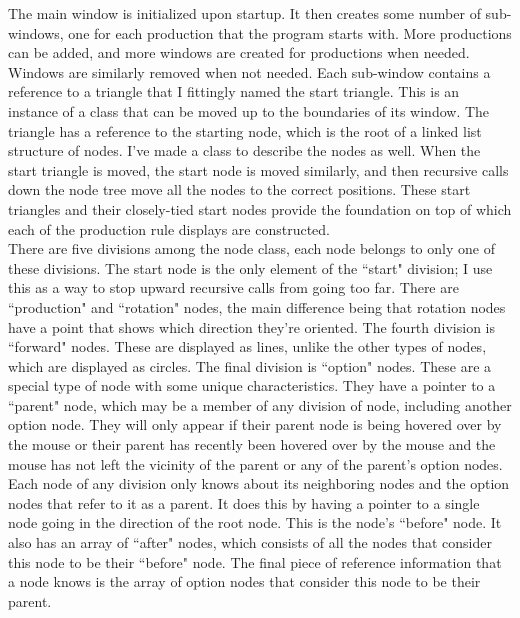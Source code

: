 \documentclass[12pt,twoside]{reedthesis}
\begin{document}
	The main window is initialized upon startup. It then creates some number of sub-windows, one for each production that the program starts with. More productions can be added, and more windows are created for productions when needed. Windows are similarly removed when not needed. Each sub-window contains a reference to a triangle that I fittingly named the start triangle. This is an instance of a class that can be moved up to the boundaries of its window. The triangle has a reference to the starting node, which is the root of a linked list structure of nodes. I've made a class to describe the nodes as well. When the start triangle is moved, the start node is moved similarly, and then recursive calls down the node tree move all the nodes to the correct positions. These start triangles and their closely-tied start nodes provide the foundation on top of which each of the production rule displays are constructed.\\
	
	There are five divisions among the node class, each node belongs to only one of these divisions. The start node is the only element of the ``start" division; I use this as a way to stop upward recursive calls from going too far. There are ``production" and ``rotation" nodes, the main difference being that rotation nodes have a point that shows which direction they're oriented. The fourth division is ``forward" nodes. These are displayed as lines, unlike the other types of nodes, which are displayed as circles. The final division is ``option" nodes. These are a special type of node with some unique characteristics. They have a pointer to a ``parent" node, which may be a member of any division of node, including another option node. They will only appear if their parent node is being hovered over by the mouse or their parent has recently been hovered over by the mouse and the mouse has not left the vicinity of the parent or any of the parent's option nodes. Each node of any division only knows about its neighboring nodes and the option nodes that refer to it as a parent. It does this by having a pointer to a single node going in the direction of the root node. This is the node's ``before" node. It also has an array of ``after" nodes, which consists of all the nodes that consider this node to be their ``before" node. The final piece of reference information that a node knows is the array of option nodes that consider this node to be their parent.\\
	
\end{document}

